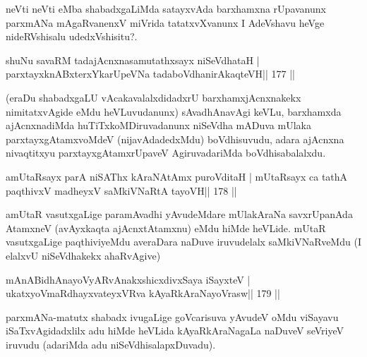 \begin{artha}
neVti neVti eMba shabadxgaLiMda satayxvAda barxhamxna rUpavanunx parxmANa mAgaRvanenxV miVrida tatatxvXvanunx I AdeVshavu heVge nideRVshisalu udedxVshisitu?.
\end{artha}

\begin{shl}
shuNu savaRM tadajAcnxnasamutathxsayx niSeVdhataH |
parxtayxknABxterxYkarUpeVNa tadaboVdhanirAkaqteVH\hfill || 177 ||
\end{shl}

\begin{artha}
(eraDu shabadxgaLU vAcakavalalxdidadxrU barxhamxjAcnxnakekx   nimitatxvAgide eMdu heVLuvudanunx) sAvadhAnavAgi keVLu, barxhamxda   ajAcnxnadiMda huTiTxkoMDiruvadanunx niSeVdha mADuva mUlaka   parxtayxgAtamxvoMdeV (nijavAdadedxMdu)  boVdhisuvudu, adara ajAcnxna   nivaqtitxyu parxtayxgAtamxrUpaveV AgiruvadariMda boVdhisabalalxdu.
\end{artha}


\begin{shl}
amUtaRsayx parA niSAThx kAraNAtAmx puroVditaH |
mUtaRsayx ca tathA paqthivxV madheyxV saMkiVNaRtA tayoVH\hfill || 178 ||
\end{shl}

\begin{artha}
amUtaR vasutxgaLige paramAvadhi yAvudeMdare mUlakAraNa savxrUpanAda
AtamxneV (avAyxkaqta ajAcnxtAtamxnu) eMdu hiMde heVLide. mUtaR
vasutxgaLige paqthiviyeMdu averaDara naDuve iruvudelalx saMkiVNaRveMdu
(I elalxvU niSeVdhakekx ahaRvAgive)
\end{artha}


\begin{shl}
mAnABidhAnayoVyARvAnakxshicxdivxSaya iSayxteV |
ukatxyoVmaRdhayxvateyxVRva kAyaRkAraNayoVrasw\hfill || 179 ||
\end{shl}

\begin{artha}
parxmANa-matutx shabadx ivugaLige goVcarisuva yAvudeV oMdu viSayavu iSaTxvAgidadxlilx adu hiMde heVLida kAyaRkAraNagaLa naDuveV seVriyeV iruvudu (adariMda adu niSeVdhisalapxDuvadu).
\end{artha}


